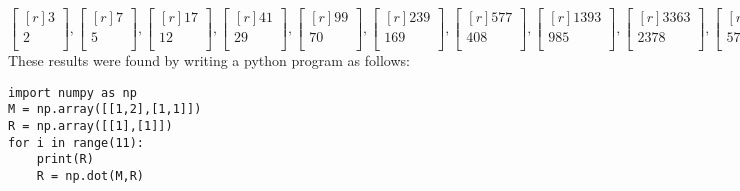 \documentclass[12pt]{article}
\theoremstyle{definition}
\theoremstyle{plain}
\begin{document}
\begin{enumerate}
\begin{enumerate}
\[ \begin{bmatrix}[r]3\\2\\\end{bmatrix},\begin{bmatrix}[r]7\\5\\\end{bmatrix},\begin{bmatrix}[r]17\\12\\\end{bmatrix},\begin{bmatrix}[r]41\\29\\\end{bmatrix},\begin{bmatrix}[r]99\\70\\\end{bmatrix},\begin{bmatrix}[r]239\\169\\\end{bmatrix},\begin{bmatrix}[r]577\\408\\\end{bmatrix},\begin{bmatrix}[r]1393\\985\\\end{bmatrix},\begin{bmatrix}[r]3363\\2378\\\end{bmatrix},\begin{bmatrix}[r]8119\\5741\\\end{bmatrix} \]
These results were found by writing a python program as follows:
\begin{verbatim}
import numpy as np
M = np.array([[1,2],[1,1]])
R = np.array([[1],[1]])
for i in range(11):
    print(R)
    R = np.dot(M,R)
\end{verbatim}


\end{enumerate}
\end{enumerate}
\end{document}

